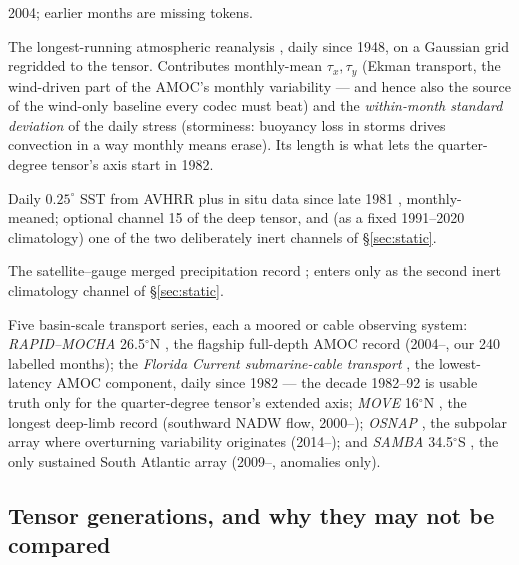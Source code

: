 \documentclass[10pt]{article}
\begin{document}
\begin{description}
  2004; earlier months are missing tokens.
\item[NCEP/NCAR Reanalysis 1 surface wind stress.] The longest-running
  atmospheric reanalysis \cite{kalnay}, daily since 1948, on a Gaussian
  grid regridded to the tensor. Contributes monthly-mean $\tau_x,
  \tau_y$ (Ekman transport, the wind-driven part of the AMOC's monthly
  variability --- and hence also the source of the wind-only baseline
  every codec must beat) and the \emph{within-month standard deviation}
  of the daily stress (storminess: buoyancy loss in storms drives
  convection in a way monthly means erase). Its length is what lets the
  quarter-degree tensor's axis start in 1982.
\item[NOAA OISST v2.1.] Daily $0.25^\circ$ SST from AVHRR plus in situ
  data since late 1981 \cite{huang}, monthly-meaned; optional channel
  15 of the deep tensor, and (as a fixed 1991--2020 climatology) one of
  the two deliberately inert channels of \S\ref{sec:static}.
\item[GPCP v2.3 precipitation climatology.] The satellite--gauge merged
  precipitation record \cite{adler}; enters only as the second inert
  climatology channel of \S\ref{sec:static}.
\item[Truth arrays (never inputs).] Five basin-scale transport series,
  each a moored or cable observing system: \emph{RAPID--MOCHA}
  26.5$^\circ$N \cite{mccarthy}, the flagship full-depth AMOC record
  (2004--, our 240 labelled months); the \emph{Florida Current
  submarine-cable transport} \cite{meinen2010}, the lowest-latency AMOC
  component, daily since 1982 --- the decade 1982--92 is usable truth
  only for the quarter-degree tensor's extended axis; \emph{MOVE}
  16$^\circ$N \cite{send}, the longest deep-limb record (southward
  NADW flow, 2000--); \emph{OSNAP} \cite{osnap}, the subpolar array
  where overturning variability originates (2014--); and \emph{SAMBA}
  34.5$^\circ$S \cite{kersale}, the only sustained South Atlantic
  array (2009--, anomalies only).
\end{description}

\subsection{Tensor generations, and why they may not be
compared}\label{sec:families}
\end{document}

